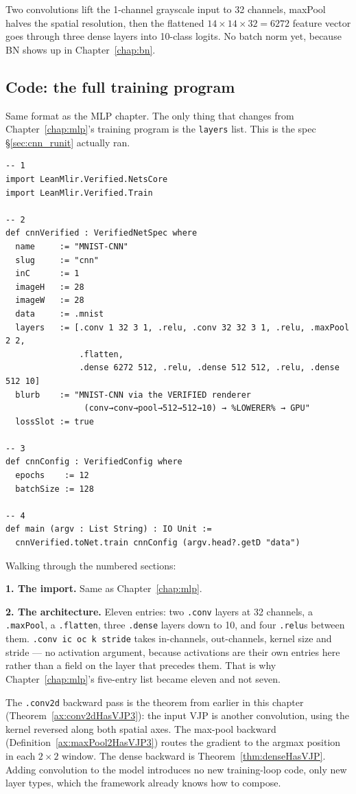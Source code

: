 Two convolutions lift the 1-channel grayscale input to 32 channels,
maxPool halves the spatial resolution, then the flattened
$14 \times 14 \times 32 = 6272$ feature vector goes through three
dense layers into 10-class logits. No batch norm yet, because BN shows
up in Chapter~\ref{chap:bn}.

\subsection*{Code: the full training program}

Same format as the MLP chapter. The only thing that changes from
Chapter~\ref{chap:mlp}'s training program is the \texttt{layers} list.
This is the spec \S\ref{sec:cnn_runit} actually ran.

\begin{verbatim}
-- 1
import LeanMlir.Verified.NetsCore
import LeanMlir.Verified.Train

-- 2
def cnnVerified : VerifiedNetSpec where
  name     := "MNIST-CNN"
  slug     := "cnn"
  inC      := 1
  imageH   := 28
  imageW   := 28
  data     := .mnist
  layers   := [.conv 1 32 3 1, .relu, .conv 32 32 3 1, .relu, .maxPool 2 2,
               .flatten,
               .dense 6272 512, .relu, .dense 512 512, .relu, .dense 512 10]
  blurb    := "MNIST-CNN via the VERIFIED renderer
                (conv→conv→pool→512→512→10) → %LOWERER% → GPU"
  lossSlot := true

-- 3
def cnnConfig : VerifiedConfig where
  epochs    := 12
  batchSize := 128

-- 4
def main (argv : List String) : IO Unit :=
  cnnVerified.toNet.train cnnConfig (argv.head?.getD "data")
\end{verbatim}

Walking through the numbered sections:

\textbf{1. The import.} Same as Chapter~\ref{chap:mlp}.

\textbf{2. The architecture.} Eleven entries: two \texttt{.conv}
layers at 32 channels, a \texttt{.maxPool}, a \texttt{.flatten}, three
\texttt{.dense} layers down to 10, and four \texttt{.relu}s between
them. \texttt{.conv ic oc k stride} takes in-channels, out-channels,
kernel size and stride --- no activation argument, because activations
are their own entries here rather than a field on the layer that
precedes them. That is why Chapter~\ref{chap:mlp}'s five-entry list
became eleven and not seven.

The \texttt{.conv2d} backward pass is the theorem from earlier in
this chapter (Theorem~\ref{ax:conv2dHasVJP3}): the input VJP is
another convolution, using the kernel reversed along both spatial
axes. The max-pool backward (Definition~\ref{ax:maxPool2HasVJP3}) routes
the gradient to the argmax position in each $2 \times 2$ window.
The dense backward is Theorem~\ref{thm:denseHasVJP}. Adding
convolution to the model introduces no new training-loop code, only
new layer types, which the framework already knows how to compose.


